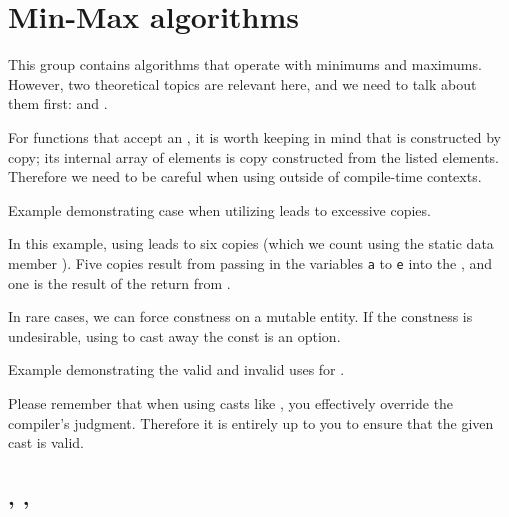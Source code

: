 \section{Min-Max algorithms}

This group contains algorithms that operate with minimums and maximums. However, two theoretical topics are relevant here, and we need to talk about them first:  and .

For functions that accept an , it is worth keeping in mind that  is constructed by copy; its internal array of elements is copy constructed from the listed elements. Therefore we need to be careful when using  outside of compile-time contexts.

\begin{box-note}
\footnotesize Example demonstrating case when utilizing  leads to excessive copies.
\tcblower
{}
\end{box-note}

In this example, using  leads to six copies (which we count using the static data member ). Five copies result from passing in the variables \texttt{a} to \texttt{e} into the , and one is the result of the return from .

In rare cases, we can force constness on a mutable entity. If the constness is undesirable, using  to cast away the const is an option.

\begin{box-note}
\footnotesize Example demonstrating the valid and invalid uses for .
\tcblower
{}
\end{box-note}

Please remember that when using casts like , you effectively override the compiler's judgment. Therefore it is entirely up to you to ensure that the given cast is valid.

\subsection{\texorpdfstring{, , }{\texttt{std::min}, \texttt{std::max}, \texttt{std::minmax}}}

